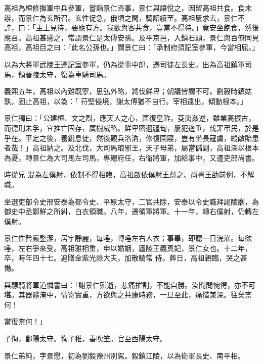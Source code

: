 \begin{pinyinscope}
 高祖為桓修撫軍中兵參軍，嘗詣景仁咨事，景仁與語悅之，因留高祖共食。食未辦，而景仁為玄所召。玄性促急，俄頃之間，騎詔續至。高祖屢求去，景仁不
 許，曰：「主上見待，要應有方。我欲與客共食，豈當不得待。」竟安坐飽食，然後應召。高祖甚感之，常謂景仁是太傅安孫。及平京邑，入鎮石頭，景仁與百僚同見高祖，高祖目之曰：「此名公孫也。」謂景仁曰：「承制府須記室參軍，今當相屈。」



 以為大將軍武陵王遵記室參軍，仍為從事中郎，遷司徒左長史。出為高祖鎮軍司馬，領晉陵太守，復為車騎司馬。



 義熙五年，高祖以內難既寧，思弘外略，將伐鮮卑；朝議皆謂不可。劉毅時鎮姑孰，固止高祖，以為：「
 苻堅侵境，謝太傅猶不自行。宰相遠出，傾動根本。」



 景仁獨曰：「公建桓、文之烈，應天人之心，匡復皇祚，芟夷姦逆，雖業高振古，而德刑未孚，宜推亡固存，廣樹威略。鮮卑密邇疆甸，屢犯邊垂，伐罪弔民，於是乎在。平定之後，養銳息徒，然後觀兵洛汭，修復園寢，豈有坐長寇虜，縱敵貽患者哉！」高祖納之。及北伐，大司馬琅邪王，天子母弟，屬當儲副，高祖深以根本為憂，轉景仁為大司馬左司馬，專總府任，右衛將軍，加給事中，又遷吏部尚書。



 時從兄
 混為左僕射，依制不得相臨，高祖啟依僕射王彪之、尚書王劭前例，不解職。



 坐選吏部令史邢安泰為都令史、平原太守，二官共除，安泰以令史職拜謁陵廟，為御史中丞鄭鮮之所糾，白衣領職。八年，遷領軍將軍。十一年，轉右僕射，仍轉左僕射。



 景仁性矜嚴整潔，居宇靜麗，每唾，轉唾左右人衣；事畢，即聽一日浣濯。每欲唾，左右爭來受。高祖雅相重，申以婚姻，廬陵王義真妃，景仁女也。十二年，卒，時年四十七。追贈金紫光祿大夫，加散騎常
 侍。葬日，高祖親臨，哭之甚慟。



 與驃騎將軍道憐書曰：「謝景仁殞逝，悲痛摧割，不能自勝。汝聞問惋愕，亦不可堪。其器體淹中，情寄實重，方欲與之共康時務，一旦至此，痛惜兼深。往矣柰何！



 當復柰何！」



 子恂，鄱陽太守。恂子稚，善吹笙。官至西陽太守。



 景仁弟純，字景懋，初為劉毅豫州別駕。毅鎮江陵，以為衛軍長史、南平相。




\end{pinyinscope}
